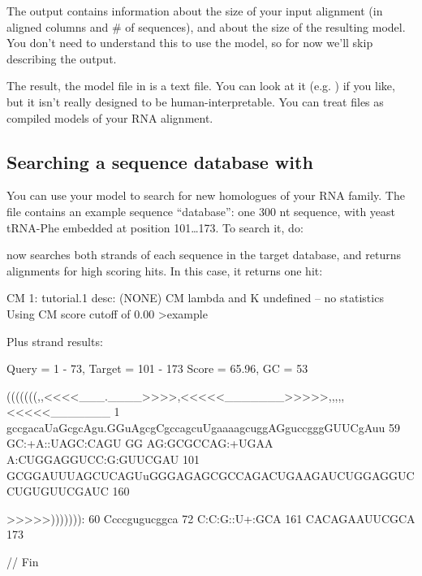 The output  contains information about the size of your
input alignment (in aligned columns and \# of sequences), and about
the size of the resulting model. You don't need to understand this to
use the model, so for now we'll skip describing the output. 

The result, the model file in  is a text file. You can
look at it (e.g. ) if you like, but it isn't really
designed to be human-interpretable. You can treat  files as
compiled models of your RNA alignment.

\subsection{Searching a sequence database with }

You can use your model to search for new homologues of your RNA
family. The file  contains an example sequence
``database'': one 300 nt sequence, with yeast tRNA-Phe embedded at
position 101\ldots173. To search it, do:


 now searches both strands of each sequence in the
target database, and returns alignments for high scoring hits.  In
this case, it returns one hit:

\begin{sreoutput}
CM 1: tutorial.1
desc: (NONE)
CM lambda and K undefined -- no statistics
Using CM score cutoff of 0.00
>example

  Plus strand results:

 Query = 1 - 73, Target = 101 - 173
 Score = 65.96, GC =  53

           (((((((,,<<<<___.____>>>>,<<<<<_______>>>>>,,,,,<<<<<_______
         1 gccgacaUaGcgcAgu.GGuAgcgCgccagcuUgaaaagcuggAGguccgggGUUCgAuu 59      
           GC:+A::UAGC:CAGU GG AG:GCGCCAG:+UGAA A:CUGGAGGUCC:G:GUUCGAU 
       101 GCGGAUUUAGCUCAGUuGGGAGAGCGCCAGACUGAAGAUCUGGAGGUCCUGUGUUCGAUC 160     

           >>>>>))))))):
        60 Ccccgugucggca 72      
           C:C:G::U+:GCA
       161 CACAGAAUUCGCA 173     


//
Fin
\end{sreoutput}

